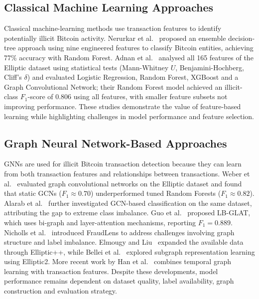 \documentclass[conference]{IEEEtran}
\begin{document}
\subsection{Classical Machine Learning Approaches}

Classical machine-learning methods use transaction features to identify
potentially illicit Bitcoin activity.
Nerurkar et al.~\cite{nerurkar2020detecting} proposed an ensemble
decision-tree approach using nine engineered features to classify Bitcoin
entities, achieving 77\% accuracy with Random Forest.
Adnan et al.~\cite{adnan2026statistical} analysed all 165 features of the
Elliptic dataset using statistical tests (Mann-Whitney $U$, Benjamini-Hochberg,
Cliff's $\delta$) and evaluated Logistic Regression, Random Forest, XGBoost
and a Graph Convolutional Network; their Random Forest model achieved an
illicit-class $F_1$-score of 0.806 using all features, with smaller feature
subsets not improving performance.
These studies demonstrate the value of feature-based learning while
highlighting challenges in model performance and feature selection.

\subsection{Graph Neural Network-Based Approaches}

GNNs are used for illicit Bitcoin transaction detection because they can
learn from both transaction features and relationships between transactions.
Weber et al.~\cite{weber2019anti} evaluated graph convolutional networks
on the Elliptic dataset and found that static GCNs ($F_1 \approx 0.70$)
underperformed tuned Random Forests ($F_1 \approx 0.82$).
Alarab et al.~\cite{alarab2020competence} further investigated GCN-based
classification on the same dataset, attributing the gap to extreme class
imbalance.
Guo et al.~\cite{guo2023lb} proposed LB-GLAT, which uses bi-graph and
layer-attention mechanisms, reporting $F_1 = 0.889$.
Nicholls et al.~\cite{nicholls2023fraudlens} introduced FraudLens to
address challenges involving graph structure and label imbalance.
Elmougy and Liu~\cite{elmougy2023demystifying} expanded the available data
through Elliptic++, while Bellei et al.~\cite{bellei2024shape} explored
subgraph representation learning using Elliptic2.
More recent work by Han et al.~\cite{han2026featuregated} combines temporal
graph learning with transaction features.
Despite these developments, model performance remains dependent on dataset
quality, label availability, graph construction and evaluation strategy.
\end{document}
